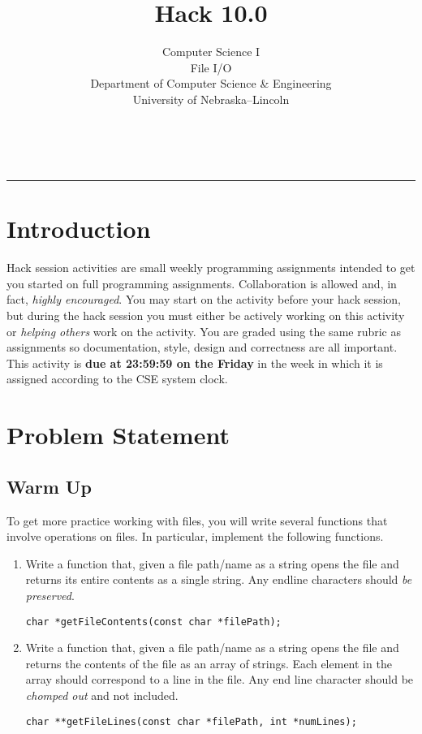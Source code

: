 \documentclass[12pt]{scrartcl}
\title{Hack 10.0}\let\Title\@title
\subtitle{Computer Science I\\
File I/O\\
{\small
\vskip1cm
Department of Computer Science \& Engineering \\
University of Nebraska--Lincoln}
\vskip-2cm}
\date{~}
\begin{document}
\maketitle

\hrule

\section*{Introduction}

Hack session activities are small weekly programming assignments intended
to get you started on full programming assignments.  Collaboration is allowed
and, in fact, \emph{highly encouraged}.  You may start on the activity before
your hack session, but during the hack session you must either be actively 
working on this activity or \emph{helping others} work on the activity.
You are graded using the same rubric as assignments so documentation, style, 
design and correctness are all important.  This activity is \textbf{due 
at 23:59:59 on the Friday} in the week in which it is assigned according 
to the CSE system clock.

\section*{Problem Statement}

\subsection*{Warm Up}

To get more practice working with files, you will write several 
functions that involve operations on files.  In particular, implement
the following functions.

\begin{enumerate}

  \item Write a function that, given a file path/name as a string opens
  the file and returns its entire contents as a single string.  Any endline
  characters should \emph{be preserved}.
  
  \texttt{char *getFileContents(const char *filePath);}

  \item Write a function that, given a file path/name as a string opens
  the file and returns the contents of the file as an array of strings.
  Each element in the array should correspond to a line in the file.
  Any end line character should be \emph{chomped out} and not included.

  \texttt{char **getFileLines(const char *filePath, int *numLines);}

\end{enumerate}
\end{document}

